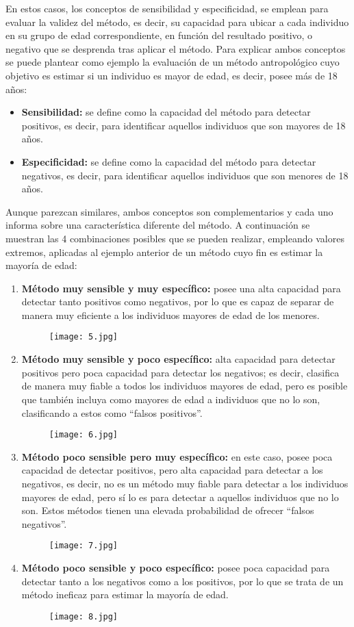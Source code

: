\documentclass[a4paper,11pt]{article}
\begin{document}
En estos casos, los conceptos de sensibilidad y especificidad, se emplean para evaluar la validez del método, es decir, su capacidad para ubicar a cada individuo en su grupo de edad correspondiente, en función del resultado positivo, o negativo que se desprenda tras aplicar el método. Para explicar ambos conceptos se puede plantear como ejemplo la evaluación de un método antropológico cuyo objetivo es estimar si un individuo es mayor de edad, es decir, posee más de 18 años:
\begin{itemize}
\item {\bf Sensibilidad:} se define como la capacidad del método para detectar positivos, es decir, para identificar aquellos individuos que son mayores de 18 años.
\item {\bf Especificidad:} se define como la capacidad del método para detectar negativos, es decir, para identificar aquellos individuos que son menores de 18 años.
\end{itemize}
Aunque parezcan similares, ambos conceptos son complementarios y cada uno informa sobre una característica diferente del método. A continuación se muestran las 4 combinaciones posibles que se pueden realizar, empleando valores extremos, aplicadas al ejemplo anterior de un método cuyo fin es estimar la mayoría de edad:
\begin{enumerate}
\item {\bf Método muy sensible y muy específico:} posee una alta capacidad para detectar tanto positivos como negativos, por lo que es capaz de separar de manera muy eficiente a los individuos mayores de edad de los menores.
\begin{figure}[h!]
\centering
\texttt{[image: 5.jpg]}
\end{figure}
\item {\bf Método muy sensible y poco específico:} alta capacidad para detectar positivos pero poca capacidad para detectar los negativos; es decir, clasifica de manera muy fiable a todos los individuos mayores de edad, pero es posible que también incluya como mayores de edad a individuos que no lo son, clasificando a estos como “falsos positivos”.
\begin{figure}[h!]
\centering
\texttt{[image: 6.jpg]}
\end{figure}
\item {\bf Método poco sensible pero muy específico:} en este caso, posee poca capacidad de detectar positivos, pero alta capacidad para detectar a los negativos, es decir, no es un método muy fiable para detectar a los individuos mayores de edad, pero sí lo es para detectar a aquellos individuos que no lo son. Estos métodos tienen una elevada probabilidad de ofrecer “falsos negativos”.
\begin{figure}[h!]
\centering
\texttt{[image: 7.jpg]}
\end{figure}
\item {\bf Método poco sensible y poco específico:} posee poca capacidad para detectar tanto a los negativos como a los positivos, por lo que se trata de un método ineficaz para estimar la mayoría de edad.
\begin{figure}[h!]
\centering
\texttt{[image: 8.jpg]}
\end{figure}
\end{enumerate}
\newpage

\end{document}

